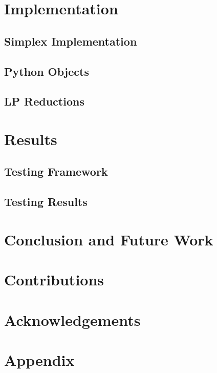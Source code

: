 \documentclass[conference]{IEEEtran}
\begin{document}
\section{Implementation}

\subsection{Simplex Implementation}
\subsection{Python Objects}

\subsection{LP Reductions}

\section{Results}
\subsection{Testing Framework}

\subsection{Testing Results}


\section{Conclusion and Future Work}

\section{Contributions}

\section{Acknowledgements}

\section{Appendix}





\end{document}
